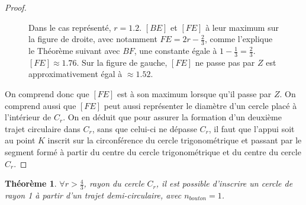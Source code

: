 \documentclass[a4paper]{amsart}
\newtheorem{theorem}{Théorème}[section]
\theoremstyle{definition}
\theoremstyle{remark}
\numberwithin{equation}{section}
\begin{document}
\begin{proof}
\begin{figure}[H]
    \caption{Dans le cas représenté, $r=1.2$. $[BE]$ et $[FE]$ à leur maximum sur la figure de droite, avec notamment $FE=2r-\frac{2}{3}$, comme l'explique le Théorème suivant avec $BF$, une constante égale à $1-\frac{1}{3}=\frac{2}{3}$.
      $[FE]\approx1.76$. Sur la figure de gauche, $[FE]$ ne passe pas par $Z$ est approximativement égal à $\approx1.52$.}
  \end{figure}

  On comprend donc que $[FE]$ est à son maximum lorsque qu'il passe par $Z$. On comprend aussi que $[FE]$ peut aussi représenter le diamètre d'un cercle placé à l'intérieur de $C_r$. On en déduit que pour assurer la formation d'un deuxième trajet circulaire dans $C_r$, sans
  que celui-ci ne dépasse $C_r$, il faut que l'appui soit au point $K$ inscrit sur la circonférence du cercle trigonométrique et passant par le segment formé à partir du centre du cercle trigonométrique et du centre du cercle $C_r$.
\end{proof}


\begin{theorem}
  $\forall r>\frac{4}{3}$, rayon du cercle $C_r$, il est possible d'inscrire un cercle de rayon 1 à partir d'un trajet demi-circulaire, avec $n_{bouton}=1$.
\end{theorem}
\end{document}
